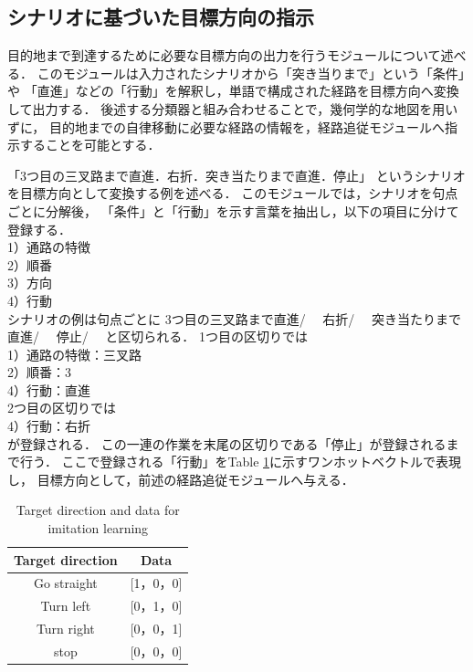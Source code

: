 \documentclass{sice-si}
\begin{document}
\subsection{シナリオに基づいた目標方向の指示}
目的地まで到達するために必要な目標方向の出力を行うモジュールについて述べる．
このモジュールは入力されたシナリオから「突き当りまで」という「条件」や
「直進」などの「行動」を解釈し，単語で構成された経路を目標方向へ変換して出力する．
後述する分類器と組み合わせることで，幾何学的な地図を用いずに，
目的地までの自律移動に必要な経路の情報を，経路追従モジュールへ指示することを可能とする．
\par
「3つ目の三叉路まで直進．右折．突き当たりまで直進．停止」
というシナリオを目標方向として変換する例を述べる．
このモジュールでは，シナリオを句点ごとに分解後，
「条件」と「行動」を示す言葉を抽出し，以下の項目に分けて登録する．\\
1）通路の特徴\\
2）順番\\
3）方向\\
4）行動\\
シナリオの例は句点ごとに
3つ目の三叉路まで直進/　
右折/　
突き当たりまで直進/　
停止/　
と区切られる．
1つ目の区切りでは\\
1）通路の特徴：三叉路\\
2）順番：3\\
4）行動：直進\\
2つ目の区切りでは\\
4）行動：右折\\
が登録される．
この一連の作業を末尾の区切りである「停止」が登録されるまで行う．
ここで登録される「行動」をTable \ref{tab:target}に示すワンホットベクトルで表現し，
目標方向として，前述の経路追従モジュールへ与える．

\begin{table}[]
    \centering
    \caption{Target direction and data for imitation learning}\label{tab:target}
    \begin{tabular}{|c|c|}
    \hline
    Target direction & Data        \\
    \hline
    Go straight   & {[}1，0，0{]} \\
    Turn left   & {[}0，1，0{]} \\
    Turn right   & {[}0，0，1{]} \\
    stop   & {[}0，0，0{]}\\
    \hline
    \end{tabular}
    \end{table}
\end{document}
